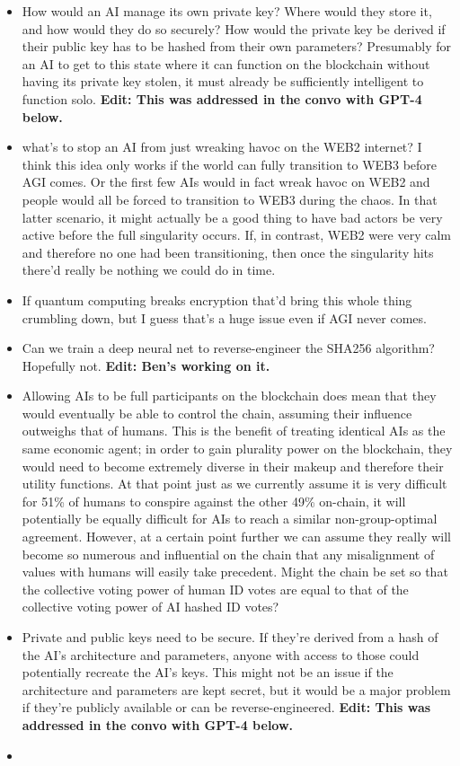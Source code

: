 \documentclass{article}[10pt]
\begin{document}
\begin{itemize}
    \item How would an AI manage its own private key?
    Where would they store it, and how would they do so securely?
    How would the private key be derived if their public key has to be hashed from their own parameters?
    Presumably for an AI to get to this state where it can function on the blockchain without having its private key stolen, it must already be sufficiently intelligent to function solo. 
    \textbf{Edit: This was addressed in the convo with GPT-4 below.}
    \item what's to stop an AI from just wreaking havoc on the WEB2 internet? 
    I think this idea only works if the world can fully transition to WEB3 before AGI comes.
    Or the first few AIs would in fact wreak havoc on WEB2 and people would all be forced to transition to WEB3 during the chaos.
    In that latter scenario, it might actually be a good thing to have bad actors be very active before the full singularity occurs.
    If, in contrast, WEB2 were very calm and therefore no one had been transitioning, then once the singularity hits there'd really be nothing we could do in time. 
    \item If quantum computing breaks encryption that'd bring this whole thing crumbling down, but I guess that's a huge issue even if AGI never comes.
    \item Can we train a deep neural net to reverse-engineer the SHA256 algorithm? 
    Hopefully not. 
    \textbf{Edit: Ben's working on it.}
    \item Allowing AIs to be full participants on the blockchain does mean that they would eventually be able to control the chain, assuming their influence outweighs that of humans.
    This is the benefit of treating identical AIs as the same economic agent; in order to gain plurality power on the blockchain, they would need to become extremely diverse in their makeup and therefore their utility functions.
    At that point just as we currently assume it is very difficult for 51\% of humans to conspire against the other 49\% on-chain, it will potentially be equally difficult for AIs to reach a similar non-group-optimal agreement.
    However, at a certain point further we can assume they really will become so numerous and influential on the chain that any misalignment of values with humans will easily take precedent.
    Might the chain be set so that the collective voting power of human ID votes are equal to that of the collective voting power of AI hashed ID votes?
    \item Private and public keys need to be secure. If they're derived from a hash of the AI's architecture and parameters, anyone with access to those could potentially recreate the AI's keys. This might not be an issue if the architecture and parameters are kept secret, but it would be a major problem if they're publicly available or can be reverse-engineered.
    \textbf{Edit: This was addressed in the convo with GPT-4 below.}
    \item 
\end{itemize}
\end{document}
